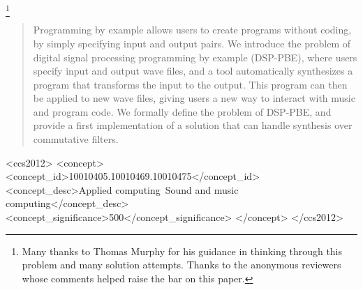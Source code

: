 \documentclass[sigplan,screen]{acmart}\settopmatter{}
\begin{document}
\author{Ruzica Piskac}






\thanks{Many thanks to Thomas Murphy for his guidance in thinking through this problem and many solution attempts. Thanks to the anonymous reviewers whose comments helped raise the bar on this paper.}       %


\begin{abstract}
Programming by example allows users to create programs without coding, by simply specifying input and output pairs.
We introduce the problem of digital signal processing programming by example (DSP-PBE), where users specify input and output wave files, and a tool automatically synthesizes a program that transforms the input to the output.
This program can then be applied to new wave files, giving users a new way to interact with music and program code.
We formally define the problem of DSP-PBE, and provide a first implementation of a solution that can handle synthesis over commutative filters.
\end{abstract}


\begin{CCSXML}
  <ccs2012>
  <concept>
  <concept_id>10010405.10010469.10010475</concept_id>
  <concept_desc>Applied computing~Sound and music computing</concept_desc>
  <concept_significance>500</concept_significance>
  </concept>
  </ccs2012>
\end{CCSXML}
\end{document}
